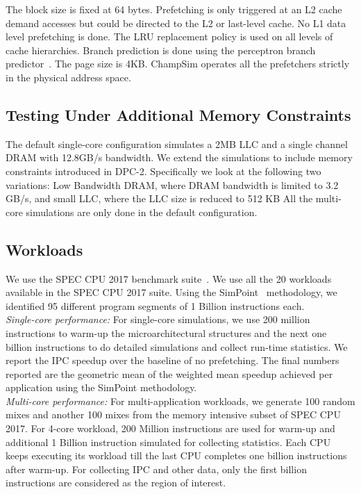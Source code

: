 The block size is fixed at 64 bytes. Prefetching is only triggered at an L2
cache demand accesses but could be directed to the L2 or last-level cache. No
L1 data level prefetching is done. The LRU replacement policy is used on all
levels of cache hierarchies. Branch prediction is done using the perceptron
branch predictor~\cite{PerceptronPredictor}. The page size is 4KB. 
ChampSim operates all the prefetchers strictly in the physical address space.

\subsection{Testing Under Additional Memory Constraints}
\label{Method-AdditionalMem}
The default single-core configuration simulates a 2MB LLC and a single channel
DRAM with 12.8GB/s bandwidth. We extend the simulations to include memory
constraints introduced in DPC-2. Specifically we look at the following two
variations: Low Bandwidth DRAM, where DRAM bandwidth is limited to 3.2 GB/s,
and small LLC, where the LLC size is reduced to 512 KB All the multi-core
simulations are only done in the default configuration.

\subsection{Workloads}
\label{Method-Workloads}

We use the SPEC CPU 2017 benchmark suite~\cite{SPEC2017}. We use all the 20
workloads available in the SPEC CPU 2017 suite. Using the SimPoint~\cite{SimPoint}
methodology, we identified 95 different program segments of 1 Billion
instructions each.\\
%
\noindent \textit{Single-core performance:} For single-core simulations, we use 200
million instructions to warm-up the microarchitectural structures and the next
one billion instructions to do detailed simulations and collect run-time
statistics. We report the IPC speedup over the baseline of no prefetching.
The final numbers reported are the geometric mean of the weighted mean speedup 
achieved per application using the SimPoint methodology.\\
%
\noindent \textit{Multi-core performance:} For multi-application workloads, we generate
100 random mixes and another 100 mixes from the memory intensive subset of
SPEC CPU 2017. For 4-core workload, 200 Million instructions are used for warm-up
and additional 1 Billion instruction simulated for collecting statistics.
Each CPU keeps executing its workload till the last CPU completes one billion
instructions after warm-up. For collecting IPC and other data, only the first
billion instructions are considered as the region of interest.

